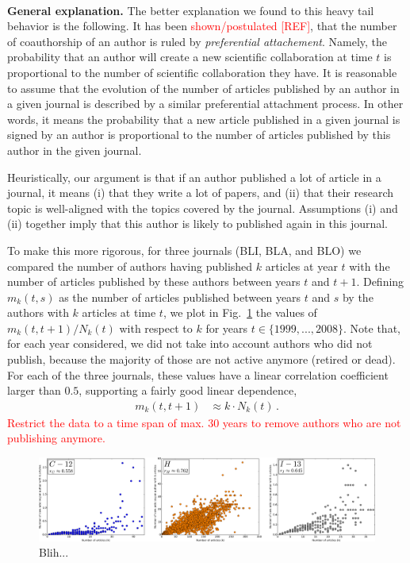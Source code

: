 \documentclass[aps,prl,floatfix,twocolumn]{revtex4-1}
\begin{document}
\paragraph{}
{\bf General explanation. }
The better explanation we found to this heavy tail behavior is the following. 
It has been \textcolor{red}{shown/postulated [REF]}, that the number of coauthorship of an author is ruled by \emph{preferential attachement}. 
Namely, the probability that an author will create a new scientific collaboration at time $t$ is proportional to the number of scientific collaboration they have. 
It is reasonable to assume that the evolution of the number of articles published by an author in a given journal is described by a similar preferential attachment process. 
In other words, it means the probability that a new article published in a given journal 
is signed by an author is proportional to the number of articles published by this author in the given journal. 

Heuristically, our argument is that if an author published a lot of article in a journal, it means (i) that they write a lot of papers, 
and (ii) that their research topic is well-aligned with the topics covered by the journal. 
Assumptions (i) and (ii) together imply that this author is likely to published again in this journal. 

To make this more rigorous, for three journals (BLI, BLA, and BLO) we compared the number of authors having published $k$ articles at year $t$ 
with the number of articles published by these authors between years $t$ and $t+1$. 
Defining $m_k(t,s)$ as the number of articles published between years $t$ and $s$ by the authors with $k$ articles at time $t$, we plot in Fig.~\ref{fig:2} the values of $m_k(t,t+1)/N_k(t)$ with respect to $k$ for years $t\in\{1999,...,2008\}$. 
Note that, for each year considered, we did not take into account authors who did not publish, because the majority of those are not active anymore (retired or dead). 
For each of the three journals, these values have a linear correlation coefficient larger than $0.5$, supporting a fairly good linear dependence, 
\begin{align}\label{eq:prop}
 m_k(t,t+1) &\approx k\cdot N_k(t)\, . 
\end{align}
\textcolor{red}{Restrict the data to a time span of max. 30 years to remove authors who are not publishing anymore.}

\begin{figure}
 \centering
 \includegraphics[width=\textwidth]{figures/CHI_correl.pdf}
 \caption{Blih...}
 \label{fig:2}
\end{figure}
\end{document}

